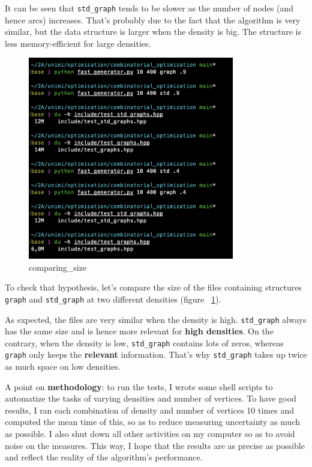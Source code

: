 \documentclass{article}
\begin{document}
It can be seen that \texttt{std\_graph} tends to be slower as the number of nodes (and hence arcs) increases. That's probably due to the fact that the algorithm is very similar, but the data structure is larger when the density is big. The structure is less memory-efficient for large densities. 


\begin{figure}[!h]
	\centering
	\includegraphics[width=9cm]{ressources/spatial_comp.png}
	\caption{comparing\_size}
	\label{fig:sizecomparizon}
\end{figure}

To check that hypothesis, let's compare the size of the files containing structures \texttt{graph} and \texttt{std\_graph} at two different densities (figure ~\ref{fig:sizecomparizon}).

As expected, the files are very similar when the density is high. \texttt{std\_graph} always has the same size and is hence more relevant for \textbf{high densities}. On the contrary, when the density is low, \texttt{std\_graph} contains lots of zeros, whereas \texttt{graph} only keeps the \textbf{relevant} information. That's why \texttt{std\_graph} takes up twice as much space on low densities.

\hfill
\hfill
\hfill

A point on \textbf{methodology}: to run the tests, I wrote some shell scripts to automatize the tasks of varying densities and number of vertices. To have good results, I ran each combination of density and number of vertices 10 times and computed the mean time of this, so as to reduce measuring uncertainty as much as possible. I also shut down all other activities on my computer so as to avoid noise on the measures. This way, I hope that the results are as precise as possible and reflect the reality of the algorithm's performance.
\end{document}
